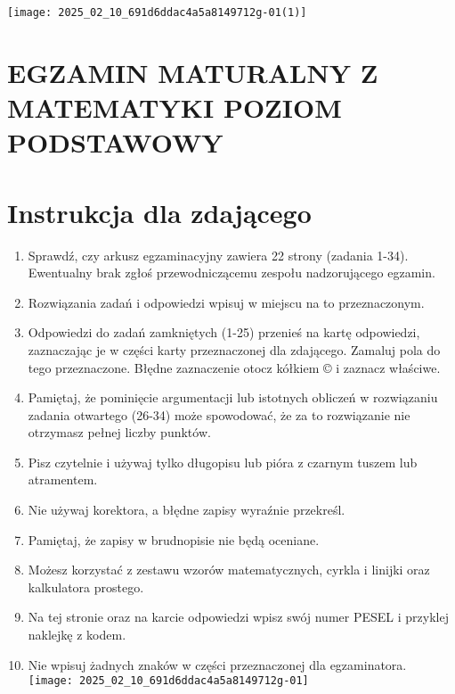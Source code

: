 \documentclass[10pt]{article}
\author{Data: 2 czerwca 2015 r.\\
Godzina rozpoczęcia: 9:00\\
CZAS PRACY: \(\mathbf{1 7 0}\) minut\\
LicZba punktów do uzyskania: 50}
\date{}
\begin{document}
\maketitle
\begin{center}
\texttt{[image: 2025\_02\_10\_691d6ddac4a5a8149712g-01(1)]}
\end{center}

\section*{EGZAMIN MATURALNY Z MATEMATYKI POZIOM PODSTAWOWY}


\section*{Instrukcja dla zdającego}
\begin{enumerate}
  \item Sprawdź, czy arkusz egzaminacyjny zawiera 22 strony (zadania 1-34). Ewentualny brak zgłoś przewodniczącemu zespołu nadzorującego egzamin.
  \item Rozwiązania zadań i odpowiedzi wpisuj w miejscu na to przeznaczonym.
  \item Odpowiedzi do zadań zamkniętych (1-25) przenieś na kartę odpowiedzi, zaznaczając je w części karty przeznaczonej dla zdającego. Zamaluj pola do tego przeznaczone. Błędne zaznaczenie otocz kółkiem © i zaznacz właściwe.
  \item Pamiętaj, że pominięcie argumentacji lub istotnych obliczeń w rozwiązaniu zadania otwartego (26-34) może spowodować, że za to rozwiązanie nie otrzymasz pełnej liczby punktów.
  \item Pisz czytelnie i używaj tylko długopisu lub pióra z czarnym tuszem lub atramentem.
  \item Nie używaj korektora, a błędne zapisy wyraźnie przekreśl.
  \item Pamiętaj, że zapisy w brudnopisie nie będą oceniane.
  \item Możesz korzystać z zestawu wzorów matematycznych, cyrkla i linijki oraz kalkulatora prostego.
  \item Na tej stronie oraz na karcie odpowiedzi wpisz swój numer PESEL i przyklej naklejkę z kodem.
  \item Nie wpisuj żadnych znaków w części przeznaczonej dla egzaminatora.\\
\texttt{[image: 2025\_02\_10\_691d6ddac4a5a8149712g-01]}
\end{enumerate}
\end{document}
